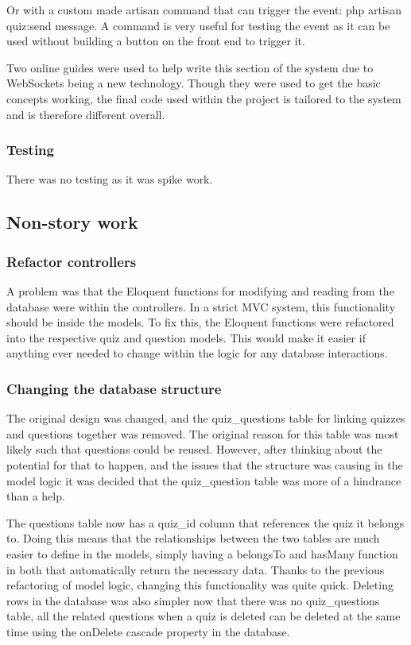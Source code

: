 Or with a custom made artisan command that can trigger the event: php artisan quiz:send {message}. A command is very useful for testing the event as it can be used without building a button on the front end to trigger it.

Two online guides were used to help write this section of the system due to WebSockets being a new technology\cite{pusher-guide}\cite{echo-guide}. Though they were used to get the basic concepts working, the final code used within the project is tailored to the system and is therefore different overall.
\subsubsection{Testing}
There was no testing as it was spike work.
\newpage

\subsection{Non-story work}
\subsubsection{Refactor controllers}
A problem was that the Eloquent functions for modifying and reading from the database were within the controllers. In a strict MVC system, this functionality should be inside the models. To fix this, the Eloquent functions were refactored into the respective quiz and question models. This would make it easier if anything ever needed to change within the logic for any database interactions.
\subsubsection{Changing the database structure}
The original design was changed, and the quiz\_questions table for linking quizzes and questions together was removed. The original reason for this table was most likely such that questions could be reused. However, after thinking about the potential for that to happen, and the issues that the structure was causing in the model logic it was decided that the quiz\_question table was more of a hindrance than a help.

The questions table now has a quiz\_id column that references the quiz it belongs to. Doing this means that the relationships between the two tables are much easier to define in the models, simply having a belongsTo and hasMany function in both that automatically return the necessary data. Thanks to the previous refactoring of model logic, changing this functionality was quite quick. Deleting rows in the database was also simpler now that there was no quiz\_questions table, all the related questions when a quiz is deleted can be deleted at the same time using the onDelete cascade property in the database.
